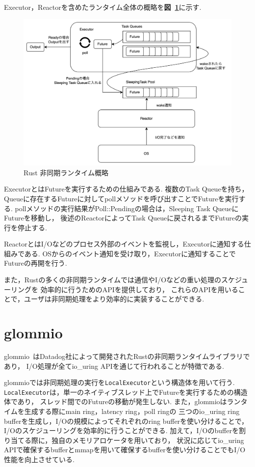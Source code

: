 \documentclass[a4paper,11pt]{jreport}
\newcommand\figref[1]{\textbf{図~\ref{fig:#1}}}
\begin{document}
Executor，Reactorを含めたランタイム全体の概略を\figref{runtime}に示す.
\begin{figure}[tb]
	\centering
	\includegraphics[width=15cm, bb=0 0 3555 2505]{figures/rust_async.drawio.png}
	\caption{Rust 非同期ランタイム概略}
	\label{fig:runtime}
\end{figure}
ExecutorとはFutureを実行するための仕組みである.
複数のTask Queueを持ち，Queueに存在するFutureに対してpollメソッドを呼び出すことでFutureを実行する.
pollメソッドの実行結果がPoll::Pendingの場合は，Sleeping Task QueueにFutureを移動し，
後述のReactorによってTask Queueに戻されるまでFutureの実行を停止する.

ReactorとはI/Oなどのプロセス外部のイベントを監視し，Executorに通知する仕組みである.
OSからのイベント通知を受け取り，Executorに通知することでFutureの再開を行う.

また，Rustの多くの非同期ランタイムでは通信やI/Oなどの重い処理のスケジューリングを
効率的に行うためのAPIを提供しており，
これらのAPIを用いることで，ユーザは非同期処理をより効率的に実装することができる.

\section{glommio}
glommio~\cite{glommio}はDatadog社によって開発されたRustの非同期ランタイムライブラリであり，
I/O処理が全てio\_uring APIを通じて行われることが特徴である.

glommioでは非同期処理の実行を\lstinline|LocalExecutor|という構造体を用いて行う.
\lstinline|LocalExecutor|は，単一のネイティブスレッド上でFutureを実行するための構造体であり，
スレッド間でのFutureの移動が発生しない.
また，glommioはランタイムを生成する際にmain ring，latency ring，poll ringの
三つのio\_uring ring bufferを生成し，I/Oの規模によってそれぞれのring bufferを使い分けることで，
I/Oのスケジューリングを効率的に行うことができる.
加えて，I/Oのbufferを割り当てる際に，独自のメモリアロケータを用いており，
状況に応じてio\_uring APIで確保するbufferとmmapを用いて確保するbufferを使い分けることでもI/O性能を向上させている.
\end{document}
